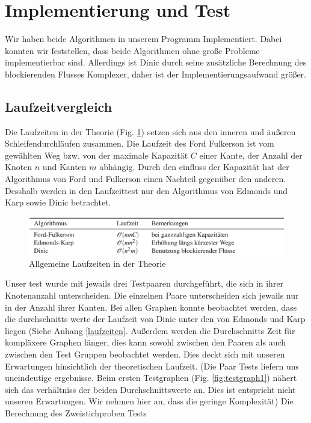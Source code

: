 \documentclass[a4paper]{llncs}
\begin{document}
\section{Implementierung und Test}
\label{Experimente}
Wir haben beide Algorithmen in unserem Programm Implementiert. Dabei konnten wir feststellen, dass beide Algorithmen ohne große Probleme implementierbar sind. Allerdings ist Dinic durch seine zusätzliche Berechnung des blockierenden Flusses Komplexer, daher ist der Implementierungsaufwand größer.
\subsection{Laufzeitvergleich}
Die Laufzeiten in der Theorie (Fig. \ref{fig:lzvergleich}) setzen sich aus den inneren und äußeren Schleifendurchläufen zusammen.
Die Laufzeit des Ford Fulkerson ist vom gewählten Weg bzw. von der maximale Kapazität $C$ einer Kante, der Anzahl der Knoten $n$ und Kanten $m$  abhängig.
Durch den einfluss der Kapazität hat der Algorithmus von Ford und Fulkerson einen Nachteil gegenüber den anderen.
Desshalb werden in den Laufzeittest nur den Algorithmus von Edmonds und Karp sowie Dinic betrachtet.
\begin{figure}[H] 
  \centering
     \includegraphics[scale=0.42]{lzvergleich} 
  \caption{Allgemeine Laufzeiten in der Theorie \citep{GKuA}}
  \label{fig:lzvergleich}
\end{figure}
Unser test wurde mit jewails drei Testpaaren durchgeführt, die sich in ihrer Knotenanzahl unterscheiden.
Die einzelnen Paare unterscheiden sich jewails nur in der Anzahl ihrer Kanten.
Bei allen Graphen konnte beobachtet werden, dass die durchschnitts werte der Laufzeit von Dinic unter den von Edmonds und Karp liegen (Siehe Anhang \ref{laufzeiten}. 
Außerdem werden die Durchschnitts Zeit für kompläxere Graphen länger, dies kann sowohl zwischen den Paaren als auch zwischen den Test Gruppen beobachtet werden.
Dies deckt sich mit unseren Erwartungen hinsichtlich der theoretischen Laufzeit.
(Die Paar Tests liefern uns uneindeutige ergebnisse. Beim ersten Testgraphen (Fig. \ref{fig:testgraph1}) nähert sich das verhältniss der beiden Durchschnittswerte an. 
Dies ist entspricht nicht unseren Erwartungen. Wir nehmen hier an, dass die geringe Komplexität)
Die Berechnung des Zweistichproben Tests
\end{document}
